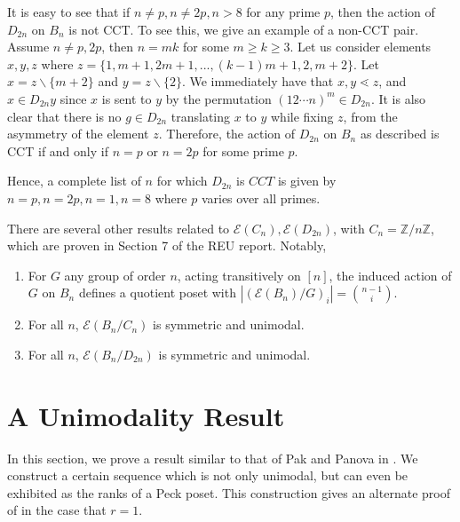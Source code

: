 \documentclass[smallextended, envcountsame, numbook]{svjour3}
\numberwithin{equation}{section}
\begin{document}
\begin{remark}
\label{rem:iff_dihedral_cct}
It is easy to see that if $n \neq p,n \neq 2p, n >8$ for any prime $p$, then the action of $D_{2n}$ on $B_n$ is not CCT. To see this, we give an example of a non-CCT pair. Assume $n \ne p, 2 p$, then $n = mk$ for some $m \ge k \ge 3$. Let us consider elements $x, y, z$ where $z = \{1, m+1, 2m+1, ..., (k-1)m+1, 2, m+2\}$. Let $x = z \backslash \{m+2\}$ and $y = z \backslash \{2\}$. We immediately have that $x, y \lessdot z$, and $x \in D_{2n} y$ since $x$ is sent to $y$ by the permutation $(12\cdots n)^m \in D_{2n}$. It is also clear that there is no $g \in D_{2n}$ translating $x$ to $y$ while fixing $z$, from the asymmetry of the element $z$. Therefore, the action of $D_{2n}$ on $B_n$ as described is CCT if and only if $n =p$ or $n = 2p$ for some prime $p$.

Hence, a complete list of $n$ for which $D_{2n}$ is $CCT$ is given by $n = p,n = 2p, n = 1, n = 8$ where $p$ varies over all primes.
\end{remark}

\begin{remark}
There are several other results related to $\mathcal E(C_n),\mathcal E(D_{2n})$, with $C_n = \mathbb Z/n\mathbb Z$, which are proven in Section 7 of the REU report. Notably,
\begin{enumerate}
	\item For $G$ any group of order $n$, acting transitively on $[n]$, the induced action of $G$ on $B_n$ defines a quotient poset with $|(\mathcal E(B_n)/G)_i| = \binom {n-1} i$.
	\item For all $n$, $\mathcal E(B_n/C_n)$ is symmetric and unimodal.
	\item For all $n$, $\mathcal E(B_n/D_{2n})$ is symmetric and unimodal.
\end{enumerate}
\end{remark}



\section{A Unimodality Result}\label{sec:wreath_product}
In this section, we prove a result similar to that of Pak and Panova in \cite[Theorem 1.1]{pak}. We construct a certain sequence which is not only unimodal, but can even be exhibited as the ranks of a Peck poset. This construction gives an alternate proof of \cite[Theorem 1.1]{pak} in the case that $r = 1$.
\end{document}
